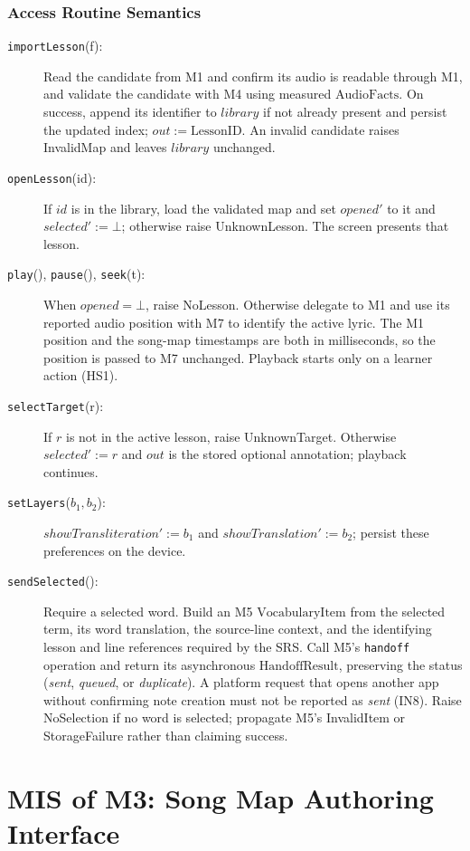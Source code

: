 \documentclass[12pt, titlepage]{article}
\begin{document}
\subsubsection{Access Routine Semantics}
\begin{description}
\item[\texttt{importLesson}(f):] Read the candidate from M1 and
confirm its audio is readable through M1, and validate the
candidate with M4 using measured $\mathrm{AudioFacts}$.
On success, append its identifier to
$library$ if not already present and persist the updated index;
$out:=\mathrm{LessonID}$. An invalid candidate raises InvalidMap
and leaves $library$ unchanged.
\item[\texttt{openLesson}(id):] If $id$ is in the library, load
the validated map and set $opened'$ to it and $selected':=\bot$;
otherwise raise UnknownLesson. The screen presents that lesson.
\item[\texttt{play}(), \texttt{pause}(), \texttt{seek}(t):]
When $opened=\bot$, raise NoLesson. Otherwise delegate to M1
and use its reported audio position with M7 to identify the active
lyric. The M1 position and the song-map timestamps are both in
milliseconds, so the position is passed to M7 unchanged. Playback starts only
on a learner action (HS1).
\item[\texttt{selectTarget}(r):] If $r$ is not in the active
lesson, raise UnknownTarget. Otherwise $selected':=r$ and
$out$ is the stored optional annotation; playback continues.
\item[\texttt{setLayers}($b_1,b_2$):]
$showTransliteration':=b_1$ and $showTranslation':=b_2$;
persist these preferences on the device.
\item[\texttt{sendSelected}():] Require a selected word. Build
an M5 $\mathrm{VocabularyItem}$ from the selected term, its word
translation, the source-line context, and the identifying lesson
and line references required by the SRS. Call M5's
\texttt{handoff} operation and return its asynchronous
$\mathrm{HandoffResult}$, preserving the status
(\emph{sent}, \emph{queued}, or \emph{duplicate}).
A platform request that opens another app without confirming note
creation must not be reported as \emph{sent} (IN8).
Raise NoSelection if no word is selected; propagate M5's
InvalidItem or StorageFailure rather than claiming success.
\end{description}

\clearpage
\section{MIS of M3: Song Map Authoring Interface} \label{MISM3}
\end{document}
